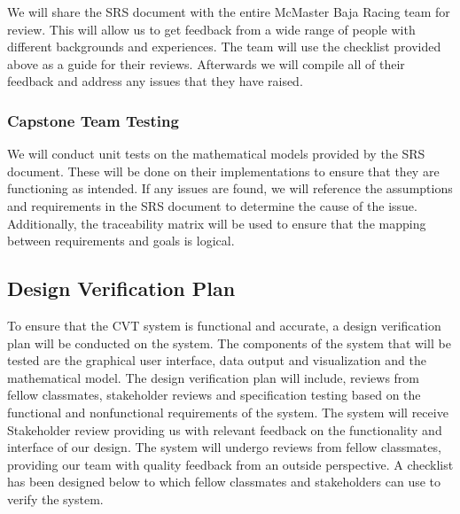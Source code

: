 \documentclass[12pt, titlepage]{article}
\begin{document}
We will share the SRS document with the entire McMaster Baja Racing team for review.
This will allow us to get feedback from a wide range of people with different backgrounds and experiences.
The team will use the checklist provided above as a guide for their reviews.
Afterwards we will compile all of their feedback and address any issues that they have raised.

\subsubsection*{Capstone Team Testing}

We will conduct unit tests on the mathematical models provided by the SRS document.
These will be done on their implementations to ensure that they are functioning as intended.
If any issues are found, we will reference the assumptions and requirements in the SRS document to determine the cause of the issue.
Additionally, the traceability matrix will be used to ensure that the mapping between requirements and goals is logical. 

\subsection{Design Verification Plan}




\noindent To ensure that the CVT system is functional and accurate, a design verification plan will be conducted on the system. 
The components of the system that will be tested are the graphical user interface, data output and visualization and the mathematical model. 
The design verification plan will include, reviews from fellow classmates, stakeholder reviews and specification testing based on the functional and nonfunctional requirements of the system. 
The system will receive Stakeholder review providing us with relevant feedback on the functionality and interface of our design.
The system will undergo reviews from fellow classmates, providing our team with quality feedback from an outside perspective. 
A checklist has been designed below to which fellow classmates and stakeholders can use to verify the system.  
\end{document}

